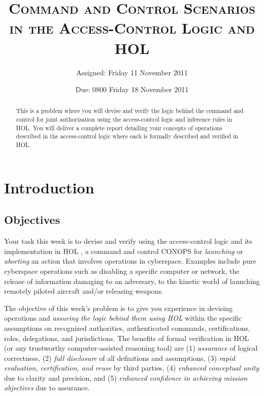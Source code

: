 \documentclass[10pt,twoside]{article}
\title{\textsc{Command and Control Scenarios in the Access-Control
    Logic and HOL}}
\author{Assigned: Friday 11 November 2011}
\date{Due: 0800 Friday 18 November 2011}
\begin{document}







\maketitle
\thispagestyle{empty}
\author{}
\maketitle

\begin{abstract}
  This is a problem where you will devise and verify the logic behind
  the command and control for joint authorization using the
  access-control logic and inference rules in HOL. You will deliver a
  complete report detailing your concepts of operations described in
  the access-control logic where each is formally described and
  verified in HOL.
\end{abstract}

\section{Introduction}
\label{sec:introduction}

\subsection{Objectives}
\label{sec:objectives}

Your task this week is to devise and verify using the access-control
logic \cite{ACST} and its implementation in HOL \cite{HOL}, a command
and control CONOPS for \emph{launching} or \emph{aborting} an action
that involves operations in cyberspace. Examples include pure
cyberspace operations such as disabling a specific computer or
network, the release of information damaging to an adversary, to the
kinetic world of launching remotely piloted aircraft and/or releasing
weapons.

The objective of this week's problem is to give you experience in
devising operations and \emph{assuring the logic behind them using
  HOL} within the specific assumptions on recognized authorities,
authenticated commands, certifications, roles, delegations, and
jurisdictions. The benefits of formal verification in HOL (or any
trustworthy computer-assisted reasoning tool) are (1) \emph{assurance}
of logical correctness, (2) \emph{full disclosure} of all definitions
and assumptions, (3) \emph{rapid evaluation, certification, and reuse}
by third parties, (4) \emph{enhanced conceptual unity} due to clarity
and precision, and (5) \emph{enhanced confidence in achieving mission
  objectives} due to assurance.
\end{document}

